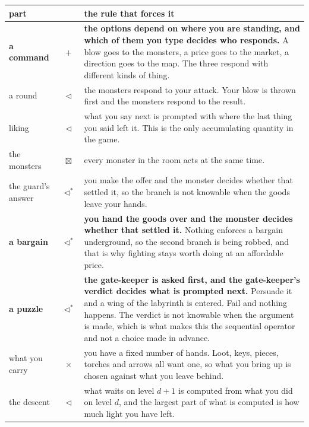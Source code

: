 \documentclass[11pt,a4paper]{article}
\newcommand{\seqb}{\lhd^{\ast}}
\begin{document}
\begin{center}
\begin{tabular}{@{}l@{\hspace{5mm}}c@{\hspace{5mm}}>{\raggedright\arraybackslash}p{}@{}}
\toprule
\textbf{part} & & \textbf{the rule that forces it} \\
\midrule
\textbf{a command}& $+$        & \textbf{the options depend on where you are standing, and which of them you type decides who responds.} A blow goes to the monsters, a price goes to the market, a direction goes to the map. The three respond with different kinds of thing. \\
a round           & $\lhd$     & the monsters respond to your attack. Your blow is thrown first and the monsters respond to the result. \\
liking            & $\lhd$     & what you say next is prompted with where the last thing you said left it. This is the only accumulating quantity in the game. \\
the monsters      & $\boxtimes$ & every monster in the room acts at the same time. \\
the guard's answer& $\seqb$    & you make the offer and the monster decides whether that settled it, so the branch is not knowable when the goods leave your hands. \\
\textbf{a bargain}& $\seqb$    & \textbf{you hand the goods over and the monster decides whether that settled it.} Nothing enforces a bargain underground, so the second branch is being robbed, and that is why fighting stays worth doing at an affordable price. \\
\textbf{a puzzle} & $\seqb$    & \textbf{the gate-keeper is asked first, and the gate-keeper's verdict decides what is prompted next.} Persuade it and a wing of the labyrinth is entered. Fail and nothing happens. The verdict is not knowable when the argument is made, which is what makes this the sequential operator and not a choice made in advance. \\
what you carry    & $\times$   & you have a fixed number of hands. Loot, keys, pieces, torches and arrows all want one, so what you bring up is chosen against what you leave behind. \\
the descent       & $\lhd$     & what waits on level $d{+}1$ is computed from what you did on level $d$, and the largest part of what is computed is how much light you have left. \\
\bottomrule
\end{tabular}
\end{center}
\normalsize
\end{document}
